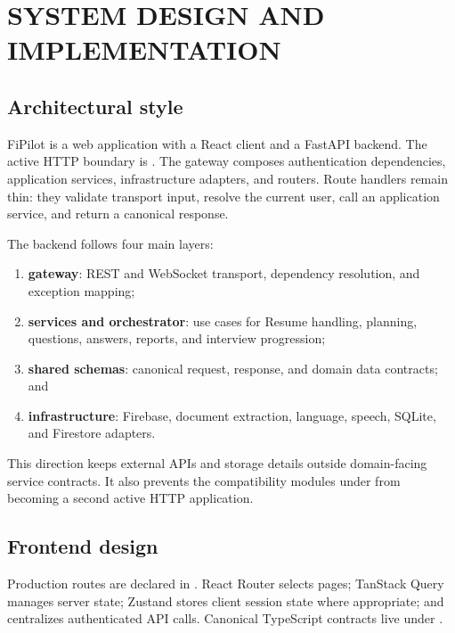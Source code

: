 \chapter{SYSTEM DESIGN AND IMPLEMENTATION}\label{ch:system-design}

\section{Architectural style}

FiPilot is a web application with a React client and a FastAPI backend. The active HTTP boundary is . The gateway composes authentication dependencies, application services, infrastructure adapters, and routers. Route handlers remain thin: they validate transport input, resolve the current user, call an application service, and return a canonical response.

The backend follows four main layers:
\begin{enumerate}
  \item \textbf{gateway}: REST and WebSocket transport, dependency resolution, and exception mapping;
  \item \textbf{services and orchestrator}: use cases for Resume handling, planning, questions, answers, reports, and interview progression;
  \item \textbf{shared schemas}: canonical request, response, and domain data contracts; and
  \item \textbf{infrastructure}: Firebase, document extraction, language, speech, SQLite, and Firestore adapters.
\end{enumerate}

This direction keeps external APIs and storage details outside domain-facing service contracts. It also prevents the compatibility modules under  from becoming a second active HTTP application.

\section{Frontend design}

Production routes are declared in . React Router selects pages; TanStack Query manages server state; Zustand stores client session state where appropriate; and  centralizes authenticated API calls. Canonical TypeScript contracts live under .



